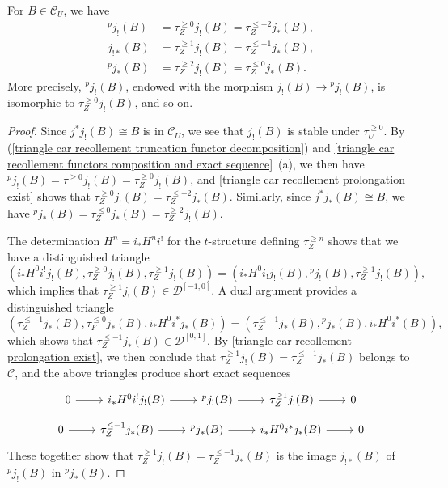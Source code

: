 \begin{proposition}\label{triangle cat recollement ^pj_! and ^pj_* is truncation}
For $B\in\mathcal{C}_U$, we have
\begin{align*}
{^pj_!}(B)&=\tau^{\geq 0}_Zj_!(B)=\tau^{\leq-2}_{Z}j_*(B),\\
j_{!*}(B)&=\tau^{\geq 1}_Zj_!(B)=\tau^{\leq-1}_Zj_*(B),\\
{^pj_*}(B)&=\tau^{\geq 2}_Zj_!(B)=\tau^{\leq 0}_Zj_*(B).
\end{align*}
More precisely, ${^pj_!}(B)$, endowed with the morphism $j_!(B)\to{^pj_!}(B)$, is isomorphic to $\tau^{\geq 0}_Zj_!(B)$, and so on.
\end{proposition}
\begin{proof}
Since $j^*j_!(B)\cong B$ is in $\mathcal{C}_U$, we see that $j_!(B)$ is stable under $\tau^{\geq 0}_U$. By (\ref{triangle car recollement truncation functor decomposition}) and \cref{triangle car recollement functors composition and exact sequence}~(a), we then have ${^pj_!}(B)=\tau^{\geq 0}j_!(B)=\tau^{\geq 0}_Zj_!(B)$, and \cref{triangle car recollement prolongation exist} shows that $\tau^{\geq 0}_Zj_!(B)=\tau^{\leq -2}_Zj_*(B)$. Similarly, since $j^*j_*(B)\cong B$, we have ${^pj_*}(B)=\tau^{\leq 0}_Zj_*(B)=\tau^{\geq 2}_Zj_!(B)$.\par
The determination $H^n=i_*H^ni^!$ for the $t$-structure defining $\tau^{\geq n}_Z$ shows that we have a distinguished triangle
\[(i_*H^0i^!j_!(B),\tau^{\geq 0}_Zj_!(B),\tau^{\geq 1}_Zj_!(B))=(i_*H^0i_!j_!(B),{^pj_!}(B),\tau^{\geq 1}_Zj_!(B)),\]
which implies that $\tau_Z^{\geq 1}j_!(B)\in\mathcal{D}^{[-1,0]}$. A dual argument provides a distinguished triangle
\[(\tau^{\leq -1}_Zj_*(B),\tau^{\leq 0}_Fj_*(B),i_*H^0i^*j_*(B))=(\tau^{\leq -1}_Zj_*(B),{^pj_*}(B),i_*H^0i^*(B)),\]
which shows that $\tau^{\leq -1}_Zj_*(B)\in\mathcal{D}^{[0,1]}$. By \cref{triangle car recollement prolongation exist}, we then conclude that $\tau^{\geq 1}_Zj_!(B)=\tau^{\leq -1}_Zj_*(B)$ belongs to $\mathcal{C}$, and the above triangles produce short exact sequences
\[\begin{tikzcd}
0\ar[r]&i_*H^0i^!j_!(B)\ar[r]&{^pj_!}(B)\ar[r]&\tau^{\geq 1}_Zj_!(B)\ar[r]&0
\end{tikzcd}\]
\vspace*{-4mm}
\[\begin{tikzcd}
0\ar[r]&\tau_Z^{\leq -1}j_*(B)\ar[r]&{^pj_*}(B)\ar[r]&i_*H^0i^*j_*(B)\ar[r]&0
\end{tikzcd}\]
These together show that $\tau^{\geq 1}_Zj_!(B)=\tau^{\leq -1}_Zj_*(B)$ is the image $j_{!*}(B)$ of ${^pj_!}(B)$ in ${^pj_*}(B)$.
\end{proof}


